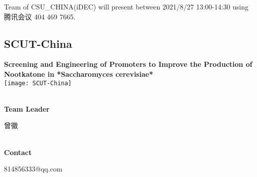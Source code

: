 \vfill{}









Team of CSU\_CHINA(iDEC) will present between 2021/8/27 13:00-14:30        using 腾讯会议 404 469 7665.
\newpage


\subsection{\textcolor{Blu}{ SCUT-China } }
\vspace{5mm}
\begin{center}
\large{
  \textbf{ Screening and Engineering of Promoters to Improve the Production of Nootkatone in *Saccharomyces cerevisiae* }\\
  \texttt{[image: SCUT-China]}
}
\end{center}
\textbf{\\Team Leader}

  曾徽


\textbf{\\Contact}

  814856333@qq.com


